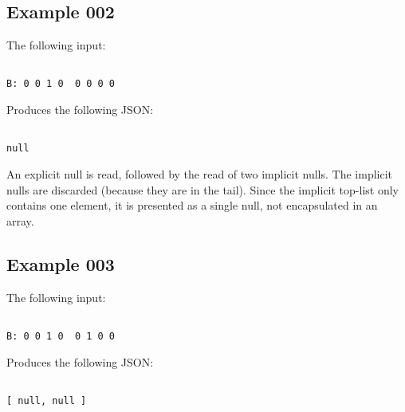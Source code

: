 \subsection{Example 002}

The following input:

\begin{changemargin}{-60mm}{0mm}
\begin{myquote}
\begin{verbatim}

B: 0 0 1 0  0 0 0 0

\end{verbatim}
\end{myquote}
\end{changemargin}

Produces the following JSON:

\begin{changemargin}{-60mm}{0mm}
\begin{myquote}
\begin{verbatim}

null

\end{verbatim}
\end{myquote}
\end{changemargin}

An explicit null is read, followed by the read of two implicit nulls.
The implicit nulls are discarded (because they are in the tail).
Since the implicit top-list only contains one element, it is presented
as a single null, not encapsulated in an array.

\subsection{Example 003}

The following input:

\begin{changemargin}{-60mm}{0mm}
\begin{myquote}
\begin{verbatim}

B: 0 0 1 0  0 1 0 0

\end{verbatim}
\end{myquote}
\end{changemargin}

Produces the following JSON:

\begin{changemargin}{-60mm}{0mm}
\begin{myquote}
\begin{verbatim}

[ null, null ]

\end{verbatim}
\end{myquote}
\end{changemargin}

